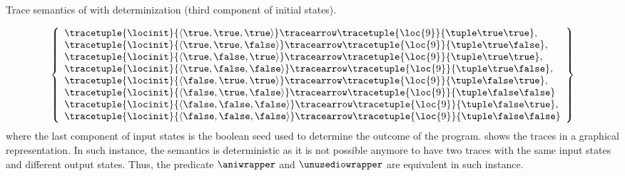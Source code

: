 \begin{example}
\begin{marginfigure}[*5]
  \caption{Trace semantics of  with determinization (third component of initial states).}
\end{marginfigure}
  \begin{eqnarray*}
    \left\{
      \begin{array}{l}
        \tracetuple{\locinit}{\langle{\true,\true,\true}\rangle}\tracearrow\tracetuple{\loc{9}}{\tuple\true\true}, \\
        \tracetuple{\locinit}{\langle{\true,\true,\false}\rangle}\tracearrow\tracetuple{\loc{9}}{\tuple\true\false}, \\
        \tracetuple{\locinit}{\langle{\true,\false,\true}\rangle}\tracearrow\tracetuple{\loc{9}}{\tuple\true\true}, \\
        \tracetuple{\locinit}{\langle{\true,\false,\false}\rangle}\tracearrow\tracetuple{\loc{9}}{\tuple\true\false}, \\
        \tracetuple{\locinit}{\langle{\false,\true,\true}\rangle}\tracearrow\tracetuple{\loc{9}}{\tuple\false\true}, \\
        \tracetuple{\locinit}{\langle{\false,\true,\false}\rangle}\tracearrow\tracetuple{\loc{9}}{\tuple\false\false} \\
        \tracetuple{\locinit}{\langle{\false,\false,\false}\rangle}\tracearrow\tracetuple{\loc{9}}{\tuple\false\true}, \\
        \tracetuple{\locinit}{\langle{\false,\false,\false}\rangle}\tracearrow\tracetuple{\loc{9}}{\tuple\false\false}
      \end{array}
    \right\}
  \end{eqnarray*}
  where the last component of input states is the boolean seed used to determine the outcome of the program.
   shows the traces in a graphical representation.
  In such instance, the semantics is deterministic as it is not possible anymore to have two traces with the same input states and different output states.
  Thus, the predicate $\aniwrapper$ and $\unusediowrapper$ are equivalent in such instance.
\end{example}

